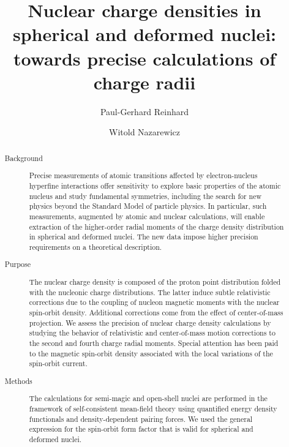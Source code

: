 \documentclass[aps,prc,twocolumn,floatfix,nofootinbib,preprintnumbers,superscriptaddress,longbibliography]{revtex4-1}
\begin{document}
\title{Nuclear charge densities in spherical and deformed nuclei: towards precise calculations of charge radii }

\author{Paul-Gerhard Reinhard}

\author{Witold Nazarewicz}



\begin{abstract}
\begin{description}
\item[Background]
Precise measurements  of atomic transitions affected by electron-nucleus hyperfine interactions offer sensitivity  to explore  basic properties of the atomic  nucleus  and  study    fundamental  symmetries, including  the  search  for  new  physics  beyond  the  Standard Model  of  particle  physics. In particular, such measurements, augmented  by atomic and nuclear calculations, will  enable extraction of the higher-order radial moments of the charge density
distribution in spherical and deformed nuclei. The new data impose higher precision requirements on a theoretical description.

\item[Purpose]
The nuclear charge density is composed of the proton point distribution folded with the    nucleonic charge distributions. The latter induce subtle relativistic corrections due to the coupling of nucleon magnetic moments  with the nuclear
spin-orbit density. Additional corrections come from  the effect of center-of-mass projection. 
We assess the precision  of nuclear charge density calculations by studying the behavior of relativistic and  center-of-mass motion corrections  to the second and fourth charge radial moments. Special attention has been paid to  the magnetic spin-orbit density associated with the local  variations of the  spin-orbit current.

\item[Methods]
The calculations for semi-magic and open-shell nuclei are performed in the framework of self-consistent mean-field theory  using  quantified  energy density functionals and density-dependent pairing forces. We used the general expression
for the spin-orbit form factor that is valid for spherical and deformed nuclei.



\end{description}
\end{abstract}
\end{document}
